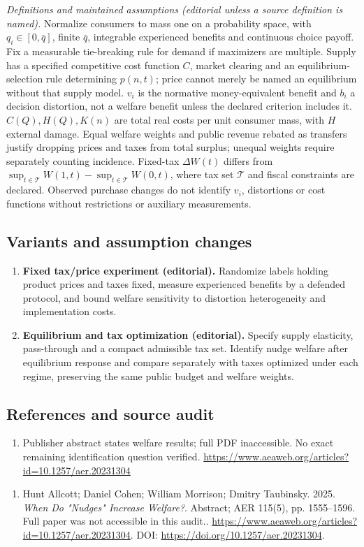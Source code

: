 \documentclass[11pt,a4paper]{article}
\begin{document}
\emph{Definitions and maintained assumptions (editorial unless a source definition is named).} Normalize consumers to mass one on a probability space, with \(q_i\in[0,\bar q]\), finite \(\bar q\), integrable experienced benefits and continuous choice payoff. Fix a measurable tie-breaking rule for demand if maximizers are multiple. Supply has a specified competitive cost function \(C\), market clearing and an equilibrium-selection rule determining \(p(n,t)\); price cannot merely be named an equilibrium without that supply model. \(v_i\) is the normative money-equivalent benefit and \(b_i\) a decision distortion, not a welfare benefit unless the declared criterion includes it. \(C(Q),H(Q),K(n)\) are total real costs per unit consumer mass, with \(H\) external damage. Equal welfare weights and public revenue rebated as transfers justify dropping prices and taxes from total surplus; unequal weights require separately counting incidence. Fixed-tax \(\Delta W(t)\) differs from \(\sup_{t\in\mathcal T}W(1,t)-\sup_{t\in\mathcal T}W(0,t)\), where tax set \(\mathcal T\) and fiscal constraints are declared. Observed purchase changes do not identify \(v_i\), distortions or cost functions without restrictions or auxiliary measurements.
\subsection*{Variants and assumption changes}
\begin{enumerate}
\item \textbf{Fixed tax/price experiment (editorial).} Randomize labels holding product prices and taxes fixed, measure experienced benefits by a defended protocol, and bound welfare sensitivity to distortion heterogeneity and implementation costs.
\item \textbf{Equilibrium and tax optimization (editorial).} Specify supply elasticity, pass-through and a compact admissible tax set. Identify nudge welfare after equilibrium response and compare separately with taxes optimized under each regime, preserving the same public budget and welfare weights.
\end{enumerate}
\subsection*{References and source audit}
\begin{enumerate}
\item Publisher abstract states welfare results; full PDF inaccessible. No exact remaining identification question verified. \url{https://www.aeaweb.org/articles?id=10.1257/aer.20231304}
\end{enumerate}
\begin{enumerate}\raggedright
\item\hypertarget{definitions:source:30007591:1}{} Hunt Allcott; Daniel Cohen; William Morrison; Dmitry Taubinsky. 2025. \emph{When Do "Nudges" Increase Welfare?}. Abstract; AER 115(5), pp. 1555–1596. Full paper was not accessible in this audit..
\url{https://www.aeaweb.org/articles?id=10.1257/aer.20231304}.
DOI: \url{https://doi.org/10.1257/aer.20231304}.
\end{enumerate}
\end{document}
